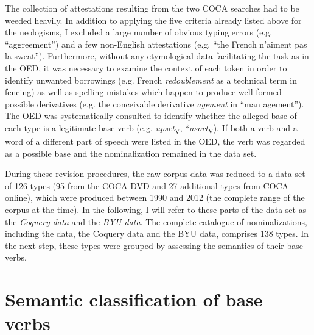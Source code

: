 The collection of attestations resulting from the two COCA searches had to be weeded heavily. In addition to applying the five criteria already listed above for the  neologisms, I excluded a large number of obvious typing errors (e.g. ``aggreement'') and a few non-English attestations (e.g. ``the French n'aiment pas la sweat''). Furthermore, without any etymological data facilitating the task as in the OED, it was necessary to examine the context of each token in order to identify unwanted borrowings (e.g. French \textit{redoublement} as a technical term in fencing) as well as spelling mistakes which happen to produce well-formed possible derivatives (e.g. the conceivable derivative \textit{agement} in ``man agement''). The OED was systematically consulted to identify whether the alleged base of each type is a legitimate base verb (e.g. \textit{upset}\textsubscript{V}, *\textit{asort}\textsubscript{V}). If both a verb and a word of a different part of speech were listed in the OED, the verb was regarded as a possible base and the nominalization remained in the data set. 

During these revision procedures, the raw corpus data was reduced to a data set of 126 types (95 from the COCA DVD and 27 additional types from COCA online), which were produced between 1990 and 2012 (the complete range of the corpus at the time). In the following, I will refer to these parts of the data set as the \textit{Coquery data} and the \textit{BYU data}.
The complete catalogue of \ment{} nominalizations, including the  data, the Coquery data and the BYU data, comprises 138 types. In the next step, these types were grouped by assessing the semantics of their base verbs. 

\section{Semantic classification of base verbs}
\label{sec:meth-Vsem}

